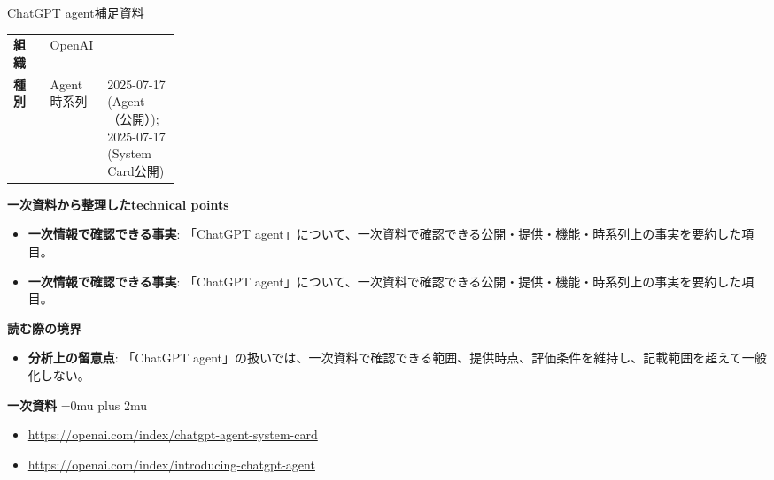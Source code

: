 \begin{technicalnote}{ChatGPT agent}{補足資料}
\begingroup
\begin{tabularx}{\linewidth}{@{}>{\bfseries}p{0.22\linewidth}X@{}}
組織 & OpenAI \\
種別 & Agent
時系列 & 2025-07-17 (Agent（公開）); 2025-07-17 (System Card公開) \\
\end{tabularx}
\smallskip
{\bfseries 一次資料から整理したtechnical points}
\begin{itemize}[leftmargin=1.5em,itemsep=0.35em]
\item \textbf{一次情報で確認できる事実}: 「ChatGPT agent」について、一次資料で確認できる公開・提供・機能・時系列上の事実を要約した項目。
\item \textbf{一次情報で確認できる事実}: 「ChatGPT agent」について、一次資料で確認できる公開・提供・機能・時系列上の事実を要約した項目。
\end{itemize}
\begin{minipage}{\linewidth}
{\bfseries 読む際の境界}
\begin{itemize}[leftmargin=1.5em,itemsep=0.35em]
\item \textbf{分析上の留意点}: 「ChatGPT agent」の扱いでは、一次資料で確認できる範囲、提供時点、評価条件を維持し、記載範囲を超えて一般化しない。
\end{itemize}
\begin{samepage}
{\bfseries 一次資料}
\begingroup\sloppy
\Urlmuskip=0mu plus 2mu\relax
\begin{itemize}[leftmargin=1.5em,itemsep=0.25em]
\item {\scriptsize\url{https://openai.com/index/chatgpt-agent-system-card}}
\item {\scriptsize\url{https://openai.com/index/introducing-chatgpt-agent}}
\end{itemize}
\endgroup
\end{samepage}
\end{minipage}
\endgroup
\end{technicalnote}
\medskip

